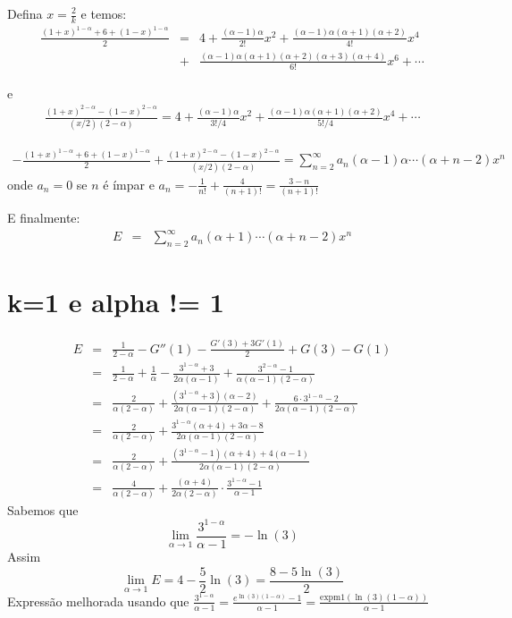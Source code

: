 \documentclass[10pt,a4paper]{article}%
\begin{document}
    Defina $x=\frac{2}{k}$ e temos:
    \begin{eqnarray*}
        \frac{(1+x)^{1-\alpha} + 6 + (1-x)^{1-\alpha}}{2}&=& 4 + \frac{(\alpha - 1) \alpha}{2!} x^2 + \frac{(\alpha - 1) \alpha (\alpha + 1) (\alpha + 2)}{4!} x^4\\ &+& \frac{(\alpha - 1) \alpha (\alpha + 1) (\alpha + 2) (\alpha + 3) (\alpha + 4)}{6!} x^6 +\cdots
    \end{eqnarray*}

e
    \begin{eqnarray*}
        \frac{(1+x)^{2-\alpha} -(1-x)^{2-\alpha}}{(x/2)(2-\alpha)} = 4 +\frac{(\alpha-1)\alpha}{3!/4}x^2 +\frac{(\alpha-1)\alpha(\alpha+1)(\alpha+2)}{5!/4}x^4 + \cdots
    \end{eqnarray*}

    \begin{eqnarray*}
        -\frac{(1+x)^{1-\alpha} + 6 + (1-x)^{1-\alpha}}{2}
        + \frac{(1+x)^{2-\alpha} -(1-x)^{2-\alpha}}{(x/2)(2-\alpha)} = \sum_{n=2}^\infty a_n(\alpha-1)\alpha\cdots (\alpha+n-2)x^n
    \end{eqnarray*}
    onde  $a_n=0$ se $n$ é ímpar e
    $a_n = -\frac{1}{n!}+\frac{4}{(n+1)!}=\frac{3-n}{(n+1)!}$

    E finalmente:
    \begin{eqnarray*}
        E&=& \sum_{n=2}^\infty a_n(\alpha+1)\cdots (\alpha+n-2)x^n
    \end{eqnarray*}
        

    \newpage
\section{k=1 e alpha != 1}
\begin{eqnarray*}
    E &=& \frac{1}{2-\alpha} - G''(1) - \frac{G'(3)+3G'(1)}{2} + G(3)-G(1)\\
    &=&\frac{1}{2-\alpha} + \frac{1}{\alpha} - \frac{3^{1-\alpha} + 3}{2\alpha(\alpha-1)}+\frac{3^{2-\alpha} - 1}{\alpha(\alpha-1)(2-\alpha)}\\
    &=&\frac{2}{\alpha(2-\alpha)} + \frac{(3^{1-\alpha} + 3)(\alpha-2)}{2\alpha(\alpha-1)(2-\alpha)}+\frac{6\cdot 3^{1-\alpha} - 2}{2\alpha(\alpha-1)(2-\alpha)}\\
    &=&\frac{2}{\alpha(2-\alpha)} + \frac{3^{1-\alpha}(\alpha+4)+3\alpha-8 }{2\alpha(\alpha-1)(2-\alpha)}\\
    &=&\frac{2}{\alpha(2-\alpha)} + \frac{(3^{1-\alpha}-1)(\alpha+4)+4(\alpha-1) }{2\alpha(\alpha-1)(2-\alpha)}\\
    &=&\frac{4}{\alpha(2-\alpha)} + \frac{(\alpha+4)}{2\alpha(2-\alpha)}\cdot \frac{3^{1-\alpha}-1}{\alpha -1 }
\end{eqnarray*}
Sabemos que
$$\lim_{\alpha \to 1} \frac{3^{1-\alpha}}{\alpha-1}=-\ln(3)$$
Assim
$$\lim_{\alpha \to 1} E= 4 - \frac{5}{2}\ln(3)= \frac{8-5\ln(3)}{2}$$
Expressão melhorada usando que $\frac{3^{1-\alpha}}{\alpha-1}=\frac{e^{\ln(3)(1-\alpha)}-1}{\alpha-1}=\frac{\text{expm1}(\ln(3)(1-\alpha))}{\alpha-1}$
\end{document}
